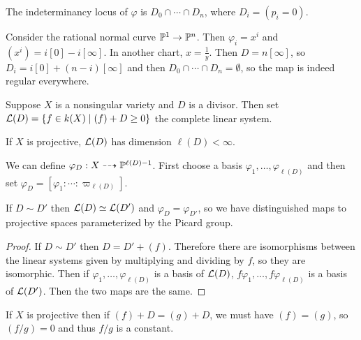 \documentclass[twoside, 10pt]{article}
\begin{document}
        \begin{thm} The indeterminancy locus of $\varphi$ is $D_0 \cap \cdots
        \cap D_n$, where $D_i = (p_i=0)$.  \end{thm}

        \begin{exm} Consider the rational normal curve $\P^1 \to \P^n$. Then
            $\varphi_i = x^i$ and $(x^i) = i[0]-i[\infty]$. In another chart,
            $x = \frac{1}{y}$. Then $D = n[\infty]$, so $D_i =
            i[0]+(n-i)[\infty]$ and then $D_0 \cap \cdots \cap D_n =
            \emptyset$, so the map is indeed regular everywhere.  \end{exm}

        Suppose $X$ is a nonsingular variety and $D$ is a divisor. Then set
        $\mc{L}(D) = \{f \in k(X) \mid (f) + D \geq 0 \}$ the complete linear
        system.

        \begin{thm}[Serre] If $X$ is projective, $\mc{L}(D)$ has dimension
        $\ell(D) < \infty$.  \end{thm}

        We can define $\varphi_D: X \dashrightarrow \P^{\ell(D)-1}$. First
        choose a basis $\varphi_1, \ldots, \varphi_{\ell(D)}$ and then set
        $\varphi_D = [\varphi_1: \cdots : \varpi_{\ell(D)}]$.

        \begin{lem} If $D \sim D'$ then $\mc{L}(D) \simeq \mc{L}(D')$ and
            $\varphi_D = \varphi_{D'}$, so we have distinguished maps to
            projective spaces parameterized by the Picard group.  \begin{proof}
                If $D \sim D'$ then $D = D'+(f)$. Therefore there are
                isomorphisms between the linear systems given by multiplying
                and dividing by $f$, so they are isomorphic. Then if
                $\varphi_1, \ldots, \varphi_{\ell(D)}$ is a basis of
                $\mc{L}(D)$, $f \varphi_1, \ldots, f \varphi_{\ell(D)}$ is a
            basis of $\mc{L}(D')$. Then the two maps are the same.  \end{proof}
        \end{lem}

        \begin{rmk} If $X$ is projective then if $(f)+D = (g)+D$, we must have
        $(f) = (g)$, so $(f/g) = 0$ and thus $f/g$ is a constant.  \end{rmk}
\end{document}
